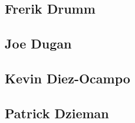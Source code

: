 \documentclass[10pt,a4paper]{article}
\begin{document}
\subsection*{Frerik Drumm}


\subsection*{Joe Dugan}


\subsection*{Kevin Diez-Ocampo}


\subsection*{Patrick Dzieman}

\end{document}
